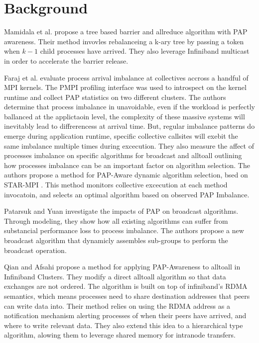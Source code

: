 \section{Background}

Mamidala et al. \cite{Mamidala2004BarrierAllreduceIBAdaptive} propose a tree based barrier and allreduce algorithm with PAP awareness. 
Their method invovles rebalanceing a k-ary tree by passing a token when $k-1$ child processes have arrived.
They also leverage Infiniband multicast in order to accelerate the barrier release.

Faraj et al. \cite{Faraj2008StudyProcArrivalMPIColl} evaluate process arrival imbalance at collectives accross a handful of MPI kernels.
The PMPI profiling interface was used to introspect on the kernel runtime and collect PAP statistics on two different clusters.
The authors determine that process imbalance in unavoidable, even if the workload is perfectly ballanced at the applictaoin level, the complexity of these massive systems will inevitably lead to diffrerencess at arrival time. 
But, regular imbalance patterns do emerge during application runtime, specific collective callsites will exebit the same imbalance multiple times during excecution.
They also measure the affect of processes imbalance on specific algorithms for broadcast and alltoall outlining how processes imbalance can be an important factor on algorithm selection.
The authors propose a method for PAP-Aware dynamic algorithm selection, bsed on STAR-MPI \cite{Faraj2006StarMPI}.
This method monitors collective excecution at each method invocatoin, and selects an optimal algorithm based on observed PAP Imbalance. 

Patarsuk and Yuan \cite{Patarasuk2008EffBcastDifProcArr} investigate the impacts of PAP on broadcast algorithms.
Through modeling, they show how all existing algorithms can suffer from substancial performance loss to process imbalance. 
The authors propose a new broadcast algorithm that dynamicly assembles sub-groups to perform the broadcast operation.

Qian and Afsahi \cite{Qian2009ProcArrivalSHMA2AIB} propose a method for applying PAP-Awareness to alltoall in Infiniband Clusters.
They modify a direct alltoall algorithm so that data exchanges are not ordered.
The algorithm is built on top of infiniband's RDMA semantics, which means processes need to share destination addresses that peers can write data into. 
Their method relies on using the RDMA address as a notification mechanism alerting processes of when their peers have arrived, and where to write relevant data.
They also extend this idea to a hierarchical type algorithm, alowing them to leverage shared memory for intranode transfers.

